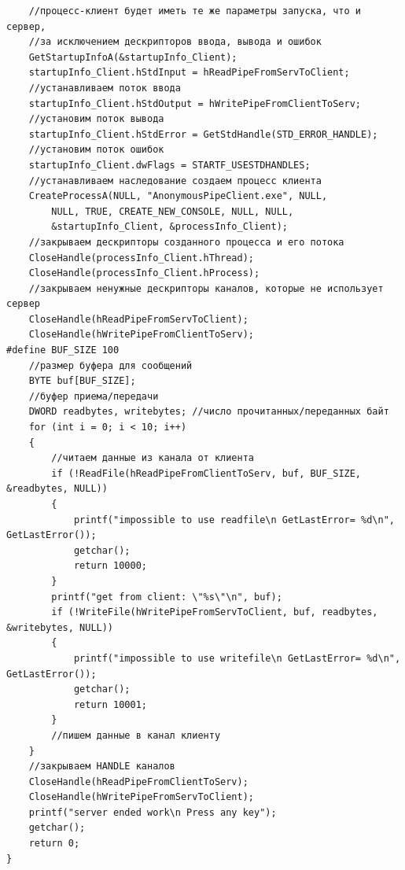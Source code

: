 \documentclass[a4paper,12pt]{article} %
\begin{document}
\begin{verbatim}
    //процесс-клиент будет иметь те же параметры запуска, что и сервер,
    //за исключением дескрипторов ввода, вывода и ошибок
    GetStartupInfoA(&startupInfo_Client);
    startupInfo_Client.hStdInput = hReadPipeFromServToClient;
    //устанавливаем поток ввода
    startupInfo_Client.hStdOutput = hWritePipeFromClientToServ;
    //установим поток вывода
    startupInfo_Client.hStdError = GetStdHandle(STD_ERROR_HANDLE);
    //установим поток ошибок
    startupInfo_Client.dwFlags = STARTF_USESTDHANDLES;
    //устанавливаем наследование создаем процесс клиента
    CreateProcessA(NULL, "AnonymousPipeClient.exe", NULL,
        NULL, TRUE, CREATE_NEW_CONSOLE, NULL, NULL,
        &startupInfo_Client, &processInfo_Client);
    //закрываем дескрипторы созданного процесса и его потока
    CloseHandle(processInfo_Client.hThread);
    CloseHandle(processInfo_Client.hProcess);
    //закрываем ненужные дескрипторы каналов, которые не использует сервер
    CloseHandle(hReadPipeFromServToClient);
    CloseHandle(hWritePipeFromClientToServ);
#define BUF_SIZE 100
    //размер буфера для сообщений
    BYTE buf[BUF_SIZE];
    //буфер приема/передачи
    DWORD readbytes, writebytes; //число прочитанных/переданных байт
    for (int i = 0; i < 10; i++)
    {
        //читаем данные из канала от клиента
        if (!ReadFile(hReadPipeFromClientToServ, buf, BUF_SIZE, &readbytes, NULL))
        {
            printf("impossible to use readfile\n GetLastError= %d\n", GetLastError());
            getchar();
            return 10000;
        }
        printf("get from client: \"%s\"\n", buf);
        if (!WriteFile(hWritePipeFromServToClient, buf, readbytes, &writebytes, NULL))
        {
            printf("impossible to use writefile\n GetLastError= %d\n", GetLastError());
            getchar();
            return 10001;
        }
        //пишем данные в канал клиенту
    }
    //закрываем HANDLE каналов
    CloseHandle(hReadPipeFromClientToServ);
    CloseHandle(hWritePipeFromServToClient);
    printf("server ended work\n Press any key");
    getchar();
    return 0;
}
\end{verbatim}

\vspace{3em}
\end{document}
